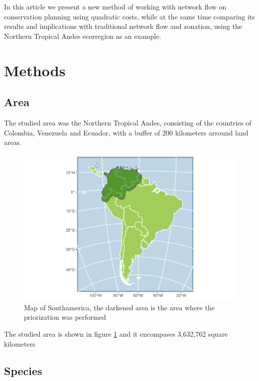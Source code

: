 \documentclass[]{article}
\begin{document}
In this article we present a new method of working with network flow on conservation planning using quadratic costs, while at the same time comparing its results and implications with traditional network flow and zonation, using the Northern Tropical Andes ecorregion as an example.

\hypertarget{methods}{%
\section{Methods}\label{methods}}

\hypertarget{area}{%
\subsection{Area}\label{area}}

The studied area was the Northern Tropical Andes, consisting of the countries of Colombia, Venezuela and Ecuador, with a buffer of 200 kilometers arround land areas.

\begin{figure}

{\centering \includegraphics{NFPaper_files/figure-latex/MapArea-1} 

}

\caption{Map of Southamerica, the darkened area is the area where the priorization was performed}\label{fig:MapArea}
\end{figure}

The studied area is shown in figure \ref{fig:MapArea} and it encompases 3,632,762 square kilometers

\hypertarget{species}{%
\subsection{Species}\label{species}}
\end{document}
